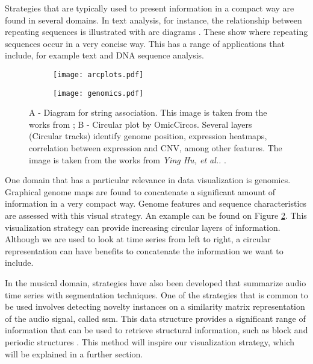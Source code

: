 Strategies that are typically used to present information in a compact way are found in several domains. In text analysis, for instance, the relationship between repeating sequences is illustrated with arc diagrams \cite{bitmap, arcplots}. These show where repeating sequences occur in a very concise way. This has a range of applications that include, for example text and DNA sequence analysis.

\begin{figure}[b]
    \centering
    \begin{subfigure}{0.5\linewidth}
    \centering
        \texttt{[image: arcplots.pdf]}
        \caption{}
        \label{fig:genomic1}
    \end{subfigure}%
    \begin{subfigure}{0.5\linewidth}
        \centering
        \texttt{[image: genomics.pdf]}
        \caption{}
        \label{fig:genomic2}
    \end{subfigure}
    \caption{A - Diagram for string association. This image is taken from the works from \cite{arcplots}; B - Circular plot by OmicCircos. Several layers (Circular tracks) identify genome position, expression heatmaps, correlation between expression and CNV, among other features. The image is taken from the works from \textit{Ying Hu, et al..} \cite{genomics}.}
    \label{fig:summary_example}
\end{figure}

One domain that has a particular relevance in data visualization is genomics. Graphical genome maps are found to concatenate a significant amount of information in a very compact way. Genome features and sequence characteristics are assessed with this visual strategy. An example can be found on Figure \ref{fig:genomic2}. This visualization strategy can provide increasing circular layers of information. Although we are used to look at time series from left to right, a circular representation can have benefits to concatenate the information we want to include.
\par
In the musical domain, strategies have also been developed that summarize audio time series with segmentation techniques. One of the strategies that is common to be used involves detecting novelty instances on a similarity matrix representation of the audio signal, called \gls{ssm}. This data structure provides a significant range of information that can be used to retrieve structural information, such as block and periodic structures \cite{fmp1, fmp2, audiolabs1, audiolabs2}. This method will inspire our visualization strategy, which will be explained in a further section.

